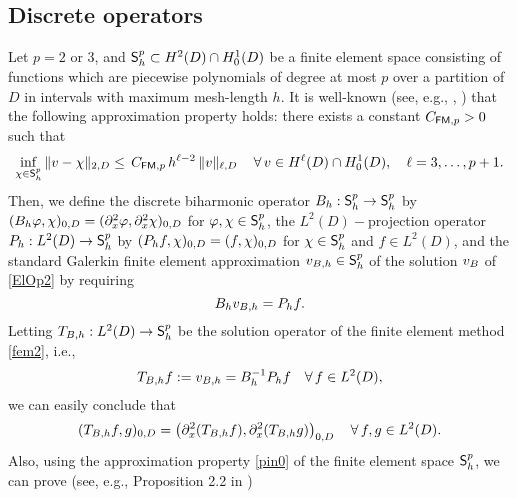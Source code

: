 \documentclass[10pt]{amsart}
\numberwithin{equation}{section}
\begin{document}
\subsection{Discrete operators}\label{SECTION41}
Let $p=2$ or $3$, and ${\sf S}_h^p\subset H^2(D)\cap H_0^1(D)$
be a finite element space consisting of functions which are piecewise
polynomials of degree at most $p$ over a partition of $D$ in
intervals with maximum mesh-length $h$.
It is well-known (see, e.g., \cite{Cia}, \cite{BrScott}) that the following approximation
property holds: there exists a constant $C_{{{\scriptscriptstyle}{\sf FM}},p}>0$ such that
\begin{equation}\label{pin0}
\inf_{\chi\in{\sf S}_h^p}\|v-\chi\|_{{\scriptscriptstyle} 2,D}
\leq\,C_{{{\scriptscriptstyle}{\sf  FM}},p}\,h^{\ell-2}\,\|v\|_{{\scriptscriptstyle} \ell,D}
\quad\,\forall\,v\in H^{\ell}(D)\cap H_0^1(D), \quad \ell=3,\dots,p+1.
\end{equation}
Then, we define the discrete biharmonic operator
$B_h:{\sf S}_h^p\to{{\sf S}_h^p}$ by
$(B_h\varphi,\chi)_{{\scriptscriptstyle} 0,D} =(\partial_x^2\varphi,\partial_x^2\chi)_{{\scriptscriptstyle} 0,D}$
for $\varphi,\chi\in{\sf S}_h^p$,
the $L^2(D)-$projection operator $P_h:L^2(D)\to{\sf S}_h^p$ by
$(P_hf,\chi)_{{\scriptscriptstyle} 0,D}=(f,\chi)_{{\scriptscriptstyle} 0,D}$ for $\chi\in{\sf S}_h^p$
and $f\in L^2(D)$,
and the standard Galerkin finite element approximation
$v_{{\scriptscriptstyle} B,h}\in{\sf S}_h^p$ of the solution $v_{{\scriptscriptstyle} B}$
of \eqref{ElOp2} by requiring
\begin{equation}\label{fem2}
B_hv_{{\scriptscriptstyle} B,h}=P_hf.
\end{equation}
Letting  $T_{{\scriptscriptstyle} B,h}:L^2(D)\to{\sf S}^p_h$ be the solution operator of
the finite element method \eqref{fem2}, i.e.,
\begin{equation*}
T_{{\scriptscriptstyle} B,h}f:=v_{{\scriptscriptstyle} B,h}=B_h^{-1}P_hf
\quad\forall\,f\in L^2(D),
\end{equation*}
we can easily conclude that
\begin{equation}\label{adjo2}
(T_{{\scriptscriptstyle} B,h}f,g)_{{\scriptscriptstyle} 0,D}=\left(\partial_x^2(T_{{\scriptscriptstyle} B,h}f),
\partial_x^2(T_{{\scriptscriptstyle} B,h}g)\right)_{{\scriptscriptstyle} 0,D}
\quad\forall\,f,g\in L^2(D).
\end{equation}
Also, using the approximation property \eqref{pin0} of the finite element space
${\sf S}_h^p$, we can prove (see, e.g., Proposition 2.2 in \cite{KZ2010})
\end{document}
